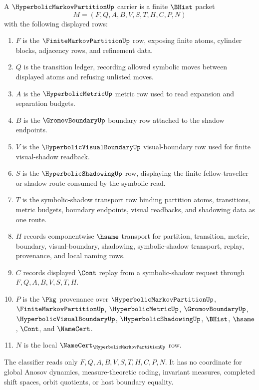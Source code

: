 \begin{definition}
\label{def:hyperbolic-markov-partition-carrier}
A $\HyperbolicMarkovPartitionUp$ carrier is a finite $\BHist$ packet
$$
M=(F,Q,A,B,V,S,T,H,C,P,N)
$$
with the following displayed rows:
\begin{enumerate}
\item $F$ is the $\FiniteMarkovPartitionUp$ row, exposing finite atoms, cylinder blocks, adjacency rows, and refinement data.
\item $Q$ is the transition ledger, recording allowed symbolic moves between displayed atoms and refusing unlisted moves.
\item $A$ is the $\HyperbolicMetricUp$ metric row used to read expansion and separation budgets.
\item $B$ is the $\GromovBoundaryUp$ boundary row attached to the shadow endpoints.
\item $V$ is the $\HyperbolicVisualBoundaryUp$ visual-boundary row used for finite visual-shadow readback.
\item $S$ is the $\HyperbolicShadowingUp$ row, displaying the finite fellow-traveller or shadow route consumed by the symbolic read.
\item $T$ is the symbolic-shadow transport row binding partition atoms, transitions, metric budgets, boundary endpoints, visual readbacks, and shadowing data as one route.
\item $H$ records componentwise $\hsame$ transport for partition, transition, metric, boundary, visual-boundary, shadowing, symbolic-shadow transport, replay, provenance, and local naming rows.
\item $C$ records displayed $\Cont$ replay from a symbolic-shadow request through $F,Q,A,B,V,S,T,H$.
\item $P$ is the $\Pkg$ provenance over $\HyperbolicMarkovPartitionUp$, $\FiniteMarkovPartitionUp$, $\HyperbolicMetricUp$, $\GromovBoundaryUp$, $\HyperbolicVisualBoundaryUp$, $\HyperbolicShadowingUp$, $\BHist$, $\hsame$, $\Cont$, and $\NameCert$.
\item $N$ is the local $\NameCert_{\HyperbolicMarkovPartitionUp}$ row.
\end{enumerate}
The classifier reads only $F,Q,A,B,V,S,T,H,C,P,N$. It has no coordinate for global Anosov dynamics, measure-theoretic coding, invariant measures, completed shift spaces, orbit quotients, or host boundary equality.
\end{definition}

